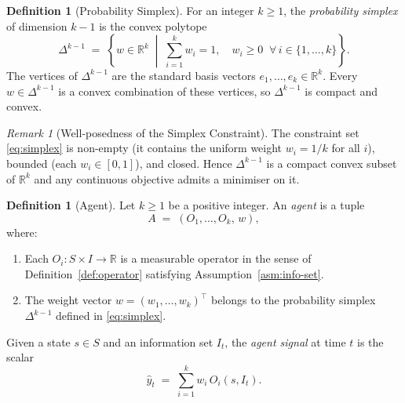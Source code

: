 \documentclass[12pt,openany]{book}
\newcommand{\R}{\mathbb{R}}
\newcommand{\calI}{\mathcal{I}}
\numberwithin{equation}{chapter}
\theoremstyle{plain}
\theoremstyle{definition}
\newtheorem{definition}[theorem]{Definition}
\theoremstyle{remark}
\newtheorem{remark}[theorem]{Remark}
\numberwithin{equation}{chapter}
\theoremstyle{plain}
\newcommand{\calS}{\mathcal{S}}
\def\calI{I}%
\def\calS{S}%
\begin{document}
\begin{definition}[Probability Simplex]
\label{def:simplex}
For an integer $k \geq 1$, the \emph{probability simplex} of dimension
$k-1$ is the convex polytope
\begin{equation}
  \Delta^{k-1}
    \;=\;
    \left\{
      w \in \R^k
      \;\middle|\;
      \sum_{i=1}^{k} w_i = 1,
      \quad
      w_i \geq 0 \;\;\forall\, i \in \{1,\ldots,k\}
    \right\}.
  \label{eq:simplex}
\end{equation}
The vertices of $\Delta^{k-1}$ are the standard basis vectors
$e_1,\ldots,e_k \in \R^k$.  Every $w \in \Delta^{k-1}$ is a convex
combination of these vertices, so $\Delta^{k-1}$ is compact and convex.
\end{definition}

\begin{remark}[Well-posedness of the Simplex Constraint]
\label{rem:simplex-wellposed}
The constraint set \eqref{eq:simplex} is non-empty (it contains the
uniform weight $w_i = 1/k$ for all $i$), bounded (each $w_i \in [0,1]$),
and closed.  Hence $\Delta^{k-1}$ is a compact convex subset of
$\R^k$ and any continuous objective admits a minimiser on it.
\end{remark}

\begin{definition}[Agent]
\label{def:agent}
Let $k \geq 1$ be a positive integer.  An \emph{agent} is a tuple
\begin{equation}
  A \;=\; (O_1,\ldots,O_k,\,w),
  \label{eq:agent-tuple}
\end{equation}
where:
\begin{enumerate}
  \item Each $O_i : \calS \times \calI \to \R$ is a measurable operator
        in the sense of Definition~\ref{def:operator} satisfying
        Assumption~\ref{asm:info-set}.
  \item The weight vector $w = (w_1,\ldots,w_k)^{\!\top}$ belongs to
        the probability simplex $\Delta^{k-1}$ defined in
        \eqref{eq:simplex}.
\end{enumerate}
Given a state $s \in \calS$ and an information set $\calI_t$, the
\emph{agent signal} at time $t$ is the scalar
\begin{equation}
  \hat{y}_t
    \;=\;
    \sum_{i=1}^{k} w_i\,O_i(s,\calI_t).
  \label{eq:agent-signal}
\end{equation}
\end{definition}
\end{document}
